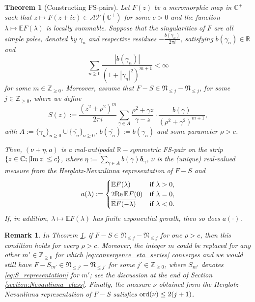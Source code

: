 \documentclass[a4paper,reqno,12pt]{amsart}
\newtheorem{theorem}{Theorem}
\newtheorem{remark}{Remark}
\newcommand{\A}{\mathcal{A}}
\renewcommand{\P}{\mathcal{P}}
\newcommand{\NN}{\mathfrak{N}}
\newcommand{\z}{\mathbb{Z}}
\renewcommand{\r}{\mathbb{R}}
\newcommand{\cp}{\mathbb{C}} %
\newcommand{\bo}{\boldsymbol}
\newcommand{\la}{\lambda}
\newcommand{\ga}{\gamma}
\newcommand{\ord}{{\rm ord}}
\newcommand{\ov}[1]{\overline{#1}}
\newcommand{\cd}{\cdot}
\newcommand{\1}{{\bf 1}}
\newcommand{\e}{\mathbb{E}}
\newcommand{\mt}{\mapsto}
\newcommand{\del}{{\bo \delta}}
\renewcommand{\Re}{{\rm Re}\,}
\renewcommand{\Im}{{\rm Im}\,}
\begin{document}
\begin{theorem}[Constructing FS-pairs]
\label{thm:converse_main}
Let $F(z)$ be a meromorphic map in $\cp^+$ such that $z\mt F(z+ic)\in\A\P(\cp^+)$ for some $c>0$ and the function $\la\mt\e F(\la)$ is locally summable. Suppose that the singularities of $F$ are all simple poles, denoted by $\ga_n$ and respective residues $-\frac{b(\ga_n)}{2\pi i}$, satisfying $b(\ga_n)\in\r$ and
\begin{equation}
\label{eq:convergence_eta_series}
    \sum_{n\geq0} \frac{|b(\ga_n)|}{(1+|\ga_n|^2)^{m+1}}<\infty
\end{equation}
for some $m\in\z_{\geq0}$. Moreover, assume that $F-S\in\NN_{\leq j}-\NN_{\leq j}$, for some $j\in\z_{\geq0}$, where we define
\begin{equation}
\label{eq:S_representation}
    S(z):=\frac{(z^2+\rho^2)^m}{2\pi i} \sum_{\ga\in A} \frac{\rho^2+\ga z}{\ga-z}\cd\frac{b(\ga)}{(\rho^2+\ga^2)^{m+1}},
\end{equation}
with $A:=\{\ga_n\}_{n\geq0}\cup\{\ov{\ga_n}\}_{n\geq0}$, $b(\ov{\ga_n}):=b(\ga_n)$ and some parameter $\rho>c$.

Then, $(\nu+\eta,a)$ is a real-antipodal $\r-$symmetric FS-pair on the strip $\{z\in\cp;|\Im{z}|\leq c\}$, where $\eta:=\sum_{\ga\in A} b(\ga)\del_{\ga}$, $\nu$ is the (unique) real-valued measure from the Herglotz-Nevanlinna representation of $F-S$ and 
\begin{equation}
\label{eq:def_function_a}
a(\la):=\begin{cases}
\e F(\la) & \text{if } \la>0,\\
2\Re \e F(0) & \text{if } \la=0,\\
\ov{\e F(-\la)} & \text{if } \la<0.
\end{cases}
\end{equation}
If, in addition, $\la\mt\e F(\la)$ has finite exponential growth, then so does $a(\cd)$.
\end{theorem}
\begin{remark}
In Theorem \ref{thm:converse_main}, if $F-S\in\NN_{\leq j}-\NN_{\leq j}$ for one $\rho>c$, then this condition holds for every $\rho>c$. Moreover, the integer $m$ could be replaced for any other $m'\in\z_{\geq0}$ for which \eqref{eq:convergence_eta_series} converges and we would still have $F-S_{m'}\in\NN_{\leq j'}-\NN_{\leq j'}$ for some $j'\in\z_{\geq0}$, where $S_{m'}$ denotes \eqref{eq:S_representation} for $m'$; see the discussion at the end of Section \ref{section:Nevanlinna_class}. Finally, the measure $\nu$ obtained from the Herglotz-Nevanlinna representation of $F-S$ satisfies $\ord(\nu)\leq 2(j+1)$. 
\end{remark}
\end{document}

